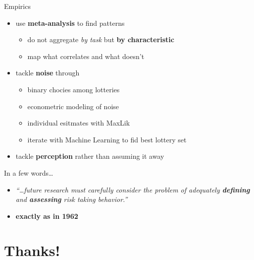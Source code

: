 \documentclass[
  ignorenonframetext,
]{beamer}
\providecommand{\tightlist}{%
  \setlength{\itemsep}{0pt}\setlength{\parskip}{0pt}}
\begin{document}
\begin{frame}{Empirics}
\protect\hypertarget{empirics}{}

\begin{itemize}
\tightlist
\item
  use \textbf{meta-analysis} to find patterns

  \begin{itemize}
  \tightlist
  \item
    do not aggregate \emph{by task} but \textbf{by characteristic}
  \item
    map what correlates and what doesn't
  \end{itemize}
\item
  tackle \textbf{noise} through

  \begin{itemize}
  \tightlist
  \item
    binary chocies among lotteries
  \item
    econometric modeling of noise
  \item
    individual esitmates with MaxLik
  \item
    iterate with Machine Learning to fid best lottery set
  \end{itemize}
\item
  tackle \textbf{perception} rather than assuming it away
\end{itemize}

\end{frame}

\begin{frame}{In a few words\ldots{}}
\protect\hypertarget{in-a-few-words}{}

\begin{itemize}[<+->]
\tightlist
\item
  \emph{``\ldots future research must carefully consider the problem of
  adequately \textbf{defining} and \textbf{assessing} risk taking
  behavior.''}
\end{itemize}

\begin{itemize}[<+->]
\tightlist
\item
  \textbf{exactly as in 1962}
\end{itemize}

\end{frame}

\hypertarget{thanks}{%
\section{Thanks!}\label{thanks}}
\end{document}
